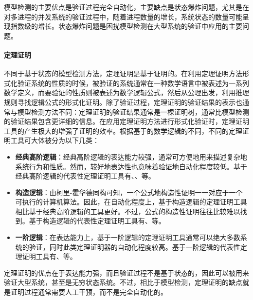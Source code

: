 模型检测的主要优点是验证过程完全自动化，主要缺点是状态爆炸问题，尤其是在对多进程的并发系统的验证过程中，随着进程数量的增长，系统状态的数量可能呈现指数级的增长。状态爆炸问题是困扰模型检测在大型系统的验证中应用的主要问题。

\paragraph{定理证明}
不同于基于状态的模型检测方法，定理证明\cite{Fitting96,Loveland78,Burel09}是基于证明的。在利用定理证明方法形式化验证系统的性质的时候，被验证的系统通常在一种数学语言中被表述为一系列数学定义，而要验证的性质则被表述为数学逻辑公式，然后从公理出发，利用推理规则寻找逻辑公式的形式化证明。除了验证过程，定理证明的验证结果的表示也通常与模型检测方法不同：定理证明的验证结果通常是一棵证明树，通常比模型检测的验证结果包含更详细的信息。在应用定理证明方法进行形式化验证时，定理证明工具的产生极大的增强了证明的效率。根据基于的数学逻辑的不同，不同的定理证明工具可大体被分为以下几类：
\begin{itemize}

	\item \textbf{经典高阶逻辑}：经典高阶逻辑的表达能力较强，通常可方便地用来描述复杂地系统行为和性质。然而，较好地表达性也意味着验证地自动化程度较低。基于经典高阶逻辑的代表性定理证明工具有\cite{Gordon00}、\cite{Nipkow12}、\cite{OwreRS92}等。
	\item \textbf{构造逻辑}：由柯里-霍华德同构可知，一个公式地构造性证明一一对应于一个可执行的计算机算法。因此，在自动化程度上，基于构造逻辑的定理证明工具相比基于经典高阶逻辑的工具更好。不过，公式的构造性证明往往比较难以找到。基于构造逻辑的代表性定理证明工具有\cite{BertotC04}、\cite{AllenCEKL00}等。
	\item \textbf{一阶逻辑}：在表达能力上，基于一阶逻辑的定理证明工具通常可以绝大多数系统的验证，同时此类定理证明器的自动化程度较高。基于一阶逻辑的代表性定理证明工具有\cite{KaufmannM08}、\cite{cs-LO-9301106}等。
\end{itemize}
定理证明的优点在于表达能力强，而且验证过程不是基于状态的，因此可以被用来验证大型系统，甚至是无穷状态系统。不过，相比于模型检测，定理证明的缺点就是证明过程通常需要人工干预，而不是完全自动化的。

